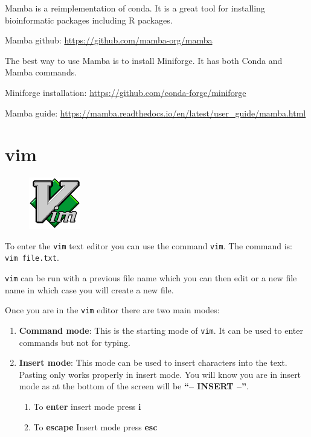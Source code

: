 \documentclass[
  letterpaper,
  DIV=11,
  numbers=noendperiod]{scrreprt}
\providecommand{\tightlist}{%
  \setlength{\itemsep}{0pt}\setlength{\parskip}{0pt}}\usepackage{longtable,booktabs,array}
\begin{document}
Mamba is a reimplementation of conda. It is a great tool for installing
bioinformatic packages including R packages.

Mamba github: \url{https://github.com/mamba-org/mamba}

The best way to use Mamba is to install Miniforge. It has both Conda and
Mamba commands.

Miniforge installation: \url{https://github.com/conda-forge/miniforge}

Mamba guide:
\url{https://mamba.readthedocs.io/en/latest/user_guide/mamba.html}

\hypertarget{vim}{%
\chapter{vim}\label{vim}}

\begin{figure}

{\centering \includegraphics[width=0.2\textwidth,height=\textheight]{figures/Vimlogo.png}

}

\end{figure}

To enter the \texttt{vim} text editor you can use the command
\texttt{vim}. The command is: \texttt{vim\ file.txt}.

\texttt{vim} can be run with a previous file name which you can then
edit or a new file name in which case you will create a new file.

Once you are in the \texttt{vim} editor there are two main modes:

\begin{enumerate}
\def\labelenumi{\arabic{enumi}.}
\tightlist
\item
  \textbf{Command mode}: This is the starting mode of \texttt{vim}. It
  can be used to enter commands but not for typing.
\item
  \textbf{Insert mode}: This mode can be used to insert characters into
  the text. Pasting only works properly in insert mode. You will know
  you are in insert mode as at the bottom of the screen will be
  \textbf{``-- INSERT --''}.

  \begin{enumerate}
  \def\labelenumii{\arabic{enumii}.}
  \tightlist
  \item
    To \textbf{enter} insert mode press \textbf{i}
  \item
    To \textbf{escape} Insert mode press \textbf{esc}
  \end{enumerate}
\end{enumerate}
\end{document}
